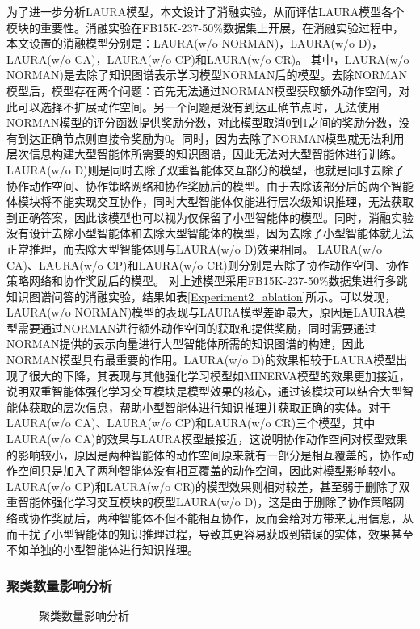 \documentclass[algorithmlist, AutoFakeBold, AutoFakeSlant, figurelist, tablelist, nomlist, engineering, openany]{seuthesix} %
\begin{document}
为了进一步分析LAURA模型，本文设计了消融实验，从而评估LAURA模型各个模块的重要性。消融实验在FB15K-237-50\%数据集上开展，在消融实验过程中，本文设置的消融模型分别是：LAURA(w/o NORMAN)，LAURA(w/o D)，LAURA(w/o CA)，LAURA(w/o CP)和LAURA(w/o CR)。
其中，LAURA(w/o NORMAN)是去除了知识图谱表示学习模型NORMAN后的模型。去除NORMAN模型后，模型存在两个问题：首先无法通过NORMAN模型获取额外动作空间，对此可以选择不扩展动作空间。另一个问题是没有到达正确节点时，无法使用NORMAN模型的评分函数提供奖励分数，对此模型取消0到1之间的奖励分数，没有到达正确节点则直接令奖励为0。同时，因为去除了NORMAN模型就无法利用层次信息构建大型智能体所需要的知识图谱，因此无法对大型智能体进行训练。
LAURA(w/o D)则是同时去除了双重智能体交互部分的模型，也就是同时去除了协作动作空间、协作策略网络和协作奖励后的模型。由于去除该部分后的两个智能体模块将不能实现交互协作，同时大型智能体仅能进行层次级知识推理，无法获取到正确答案，因此该模型也可以视为仅保留了小型智能体的模型。同时，消融实验没有设计去除小型智能体和去除大型智能体的模型，因为去除了小型智能体就无法正常推理，而去除大型智能体则与LAURA(w/o D)效果相同。
LAURA(w/o CA)、LAURA(w/o CP)和LAURA(w/o CR)则分别是去除了协作动作空间、协作策略网络和协作奖励后的模型。
对上述模型采用FB15K-237-50\%数据集进行多跳知识图谱问答的消融实验，结果如表\ref{Experiment2_ablation}所示。可以发现，LAURA(w/o NORMAN)模型的表现与LAURA模型差距最大，原因是LAURA模型需要通过NORMAN进行额外动作空间的获取和提供奖励，同时需要通过NORMAN提供的表示向量进行大型智能体所需的知识图谱的构建，因此NORMAN模型具有最重要的作用。LAURA(w/o D)的效果相较于LAURA模型出现了很大的下降，其表现与其他强化学习模型如MINERVA模型的效果更加接近，说明双重智能体强化学习交互模块是模型效果的核心，通过该模块可以结合大型智能体获取的层次信息，帮助小型智能体进行知识推理并获取正确的实体。对于LAURA(w/o CA)、LAURA(w/o CP)和LAURA(w/o CR)三个模型，其中LAURA(w/o CA)的效果与LAURA模型最接近，这说明协作动作空间对模型效果的影响较小，原因是两种智能体的动作空间原来就有一部分是相互覆盖的，协作动作空间只是加入了两种智能体没有相互覆盖的动作空间，因此对模型影响较小。LAURA(w/o CP)和LAURA(w/o CR)的模型效果则相对较差，甚至弱于删除了双重智能体强化学习交互模块的模型LAURA(w/o D)，这是由于删除了协作策略网络或协作奖励后，两种智能体不但不能相互协作，反而会给对方带来无用信息，从而干扰了小型智能体的知识推理过程，导致其更容易获取到错误的实体，效果甚至不如单独的小型智能体进行知识推理。

\subsubsection{聚类数量影响分析}
\begin{figure}[t]
  \centering
  \caption{聚类数量影响分析}
  \label{Experiment2_layer}
\end{figure}
\end{document}
